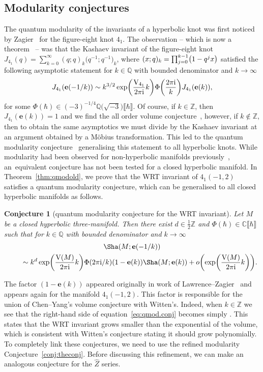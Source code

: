 \documentclass[pdftex]{sigma}
\numberwithin{equation}{section}
\newtheorem{Conjecture}[Theorem]{Conjecture}
\def\BZ{\mathbb{Z}}
\def\BQ{\mathbb{Q}}
\def\BC{\mathbb{C}}
\def\ae{\sim}
\def\e{\mathbf e}
\def\VC{\mathrm{VC}}
\def\WRT{\Sha}
\def\BZ{\mathbb Z}
\def\BQ{\mathbb Q}
\def\BC{\mathbb C}
\def\VC{\mathrm{V}}
\begin{document}
\subsection{Modularity conjectures}

The quantum modularity of the invariants of a hyperbolic knot was first noticed by Zagier~\cite{Zagier:Qmod} for the figure-eight knot $4_1$. The observation -- which is now a theorem~\cite{BetDrap,GZ:RQMOD} -- was that the Kashaev invariant of the figure-eight knot $J_{4_1}(q)=\sum_{k=0}^{\infty}(q;q)_{k}\bigl(q^{-1};q^{-1}\bigr)_{k}$, where $(x;q)_k=\smash{\prod_{j=0}^{k-1}\bigl(1-q^jx\bigr)}$ satisfied the following asymptotic statement for $k\in\BQ$ with bounded denominator and $k\rightarrow\infty$
\[
 J_{4_1}(\e(-1/k))
 \ae
 k^{3/2}\exp\biggl(\frac{\VC_{4_1}}{2\pi {\rm i}}k\biggr)\Phi\biggl(\frac{2\pi {\rm i}}{k}\biggr)
 J_{4_1}(\e(k)) ,
\]
for some $\Phi(\hbar)\in(-3)^{-1/4}\BQ\bigl(\sqrt{-3}\bigr)\llbracket\hbar\rrbracket$. Of course, if $k\in\BZ$, then $J_{4_1}(\e(k))=1$ and we find the all order volume conjecture~\cite{GarLe:asymp,Gukov}, however, if $k\notin\BZ$, then to obtain the same asymptotics we must divide by the Kashaev invariant at an argument obtained by a M\"obius transformation. This led to the quantum modularity conjecture~\cite{Zagier:Qmod} generalising this statement to all hyperbolic knots. While modularity had been observed for non-hyperbolic manifolds previously~\cite{Cheng:3dmod,Hikami,LawrenceZag}, an~equivalent conjecture has not been tested for a closed hyperbolic manifold. In Theorem~\ref{thm:qmodold}, we prove that the WRT invariant of $4_1(-1,2)$ satisfies a quantum modularity conjecture, which can be generalised to all closed hyperbolic manifolds as follows.
\begin{Conjecture}[quantum modularity conjecture for the WRT invariant]
Let $M$ be a closed hyperbolic three-manifold. Then there exist $d\in\frac{1}{2}\BZ$ and $\Phi(\hbar)\in\BC\llbracket\hbar\rrbracket$ such that for $k\in\BQ$ with bounded denominator and $k\rightarrow\infty$
\begin{gather}
 \WRT(M;\e(-1/k))
\nonumber\\
\qquad{} \ae
 k^{d}\exp\biggl(\frac{\VC(M)}{2\pi {\rm i}}k\biggr)
 \Phi(2\pi {\rm i}/k)(1-\e(k))\WRT(M;\e(k))
 +o\biggl(\exp\biggl(\frac{\VC(M)}{2\pi {\rm i}}k\biggr)\biggr).\label{eq:qmod.conj}
\end{gather}
\end{Conjecture}
The factor $(1-\e(k))$ appeared originally in work of Lawrence--Zagier~\cite{LawrenceZag} and appears again for the manifold $4_1(-1,2)$. This factor is responsible for the union of Chen--Yang's volume conjecture with Witten's. Indeed, when $k\in\BZ$ we see that the right-hand side of equation~\eqref{eq:qmod.conj} becomes simply \smash{$o\bigl(\!\exp\bigl(\frac{\VC(M)}{2\pi {\rm i}}k\bigr)\bigr)$}. This states that the WRT invariant grows smaller than the exponential of the volume, which is consistent with Witten's conjecture stating it should grow polynomially. To completely link these conjectures, we need to use the refined modularity Conjecture~\ref{conj:theconj}. Before discussing this refinement, we can make an analogous conjecture for the $\widehat{Z}$ series.
\end{document}
